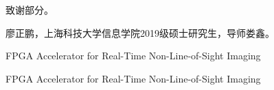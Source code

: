 \documentclass[master]{shtthesis}             %
\makeatletter
\def\ifgraduate{\ifsht@graduate}
\makeatother
\begin{document}

\backmatter
\begin{acknowledgement}
致谢部分。
\end{acknowledgement}

\ifgraduate
\begin{resume}
  廖正鹏，上海科技大学信息学院2019级硕士研究生，导师娄鑫。
\end{resume}

\begin{publications}
  FPGA Accelerator for Real-Time Non-Line-of-Sight Imaging
\end{publications}

\begin{publications*}
  FPGA Accelerator for Real-Time Non-Line-of-Sight Imaging
\end{publications*}



\fi
\end{document}
